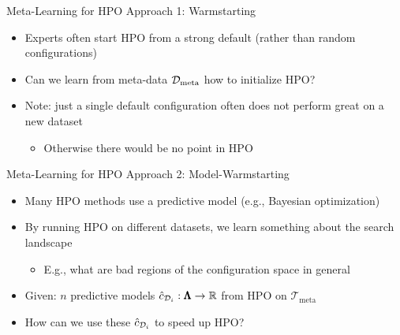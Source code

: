 \begin{frame}[c]{Meta-Learning for HPO Approach 1: Warmstarting}
	
\begin{itemize}
	\item Experts often start HPO from a strong default (rather than random configurations)
	\pause
	\medskip
	\item Can we learn from meta-data $\mathcal{D}_{\text{meta}}$ how to \alert{initialize} HPO?
	\pause
	\medskip
	\item Note: just a single default configuration often does not perform great on a new dataset
	\begin{itemize}
		\item Otherwise there would be no point in HPO
	\end{itemize}
\end{itemize}

\end{frame}
\begin{frame}[c]{Meta-Learning for HPO Approach 2: Model-Warmstarting}

\begin{itemize}
	\item Many HPO methods use a predictive model (e.g., Bayesian optimization)
	\medskip
	\item By running HPO on different datasets,
	we learn something about the search landscape
	\begin{itemize}
		\item E.g., what are bad regions of the configuration space in general
	\end{itemize}
	\bigskip
	\pause
	\item Given: $n$ predictive models $\hat{c}_{\mathcal{D}_i}: \pmb{\Lambda} \to \mathbb{R}$ from HPO on $\mathcal{T}_{\text{meta}}$	
	\item \alert{How can we use these $\hat{c}_{\mathcal{D}_i}$ to speed up HPO?}
\end{itemize}


\end{frame}

